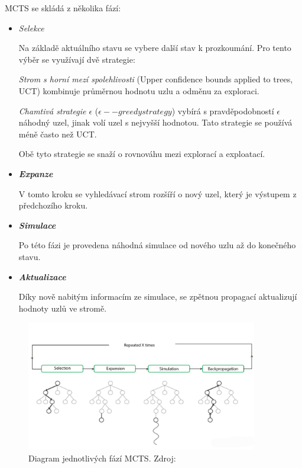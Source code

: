 MCTS se skládá z několika fází:
\begin{itemize}
  \item \emph{Selekce}

  Na základě aktuálního stavu se vybere další stav k prozkoumání.
  Pro tento výběr se využívají dvě strategie:
  
  \emph{Strom s horní mezí spolehlivosti} (Upper confidence bounds applied to trees, UCT) kombinuje průměrnou hodnotu uzlu a odměnu za exploraci.

  \label{epsilon_greedy}
  \emph{Chamtivá strategie $\epsilon$ } ($\epsilon--greedy strategy$) vybírá s pravděpodobností $\epsilon$ náhodný uzel, jinak volí uzel s nejvyšší hodnotou.
  Tato strategie se používá méně často než UCT\@.

  Obě tyto strategie se snaží o rovnováhu mezi explorací a exploatací.
  \item \textbf{\emph{Expanze}}

  V tomto kroku se vyhledávací strom rozšíří o nový uzel, který je výstupem z předchozího kroku.

  \item \textbf{\emph{Simulace}}

  Po této fázi je provedena náhodná simulace od nového uzlu až do konečného stavu.

  \item \textbf{\emph{Aktualizace}}
  
  Díky nově nabitým informacím ze simulace, se zpětnou propagací aktualizují hodnoty uzlů ve stromě.

\end{itemize}

\begin{figure}[H]
	\centering
	\includegraphics[width=0.9\textwidth]{obrazky-figures/mcts}
	\caption{Diagram jednotlivých fází MCTS.
  Zdroj: \cite{Monte_Carlo_Tree_Search}}\label{fig:mcts}
\end{figure}

